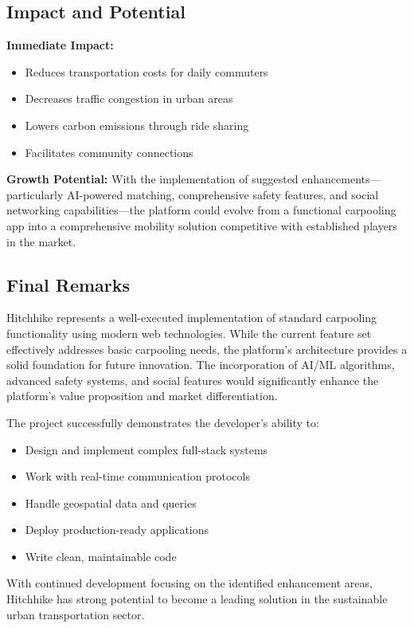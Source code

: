 \documentclass[12pt,a4paper]{article}
\begin{document}
\subsection{Impact and Potential}

\textbf{Immediate Impact:}
\begin{itemize}
    \item Reduces transportation costs for daily commuters
    \item Decreases traffic congestion in urban areas
    \item Lowers carbon emissions through ride sharing
    \item Facilitates community connections
\end{itemize}

\textbf{Growth Potential:}
With the implementation of suggested enhancements—particularly AI-powered matching, comprehensive safety features, and social networking capabilities—the platform could evolve from a functional carpooling app into a comprehensive mobility solution competitive with established players in the market.

\subsection{Final Remarks}

Hitchhike represents a well-executed implementation of standard carpooling functionality using modern web technologies. While the current feature set effectively addresses basic carpooling needs, the platform's architecture provides a solid foundation for future innovation. The incorporation of AI/ML algorithms, advanced safety systems, and social features would significantly enhance the platform's value proposition and market differentiation.

The project successfully demonstrates the developer's ability to:
\begin{itemize}
    \item Design and implement complex full-stack systems
    \item Work with real-time communication protocols
    \item Handle geospatial data and queries
    \item Deploy production-ready applications
    \item Write clean, maintainable code
\end{itemize}

With continued development focusing on the identified enhancement areas, Hitchhike has strong potential to become a leading solution in the sustainable urban transportation sector.
\end{document}

